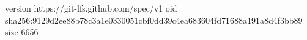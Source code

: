 version https://git-lfs.github.com/spec/v1
oid sha256:9129d2ee88b78c3a1e0330051cbf0dd39c4ea683604fd71688a191a8d4f3bb89
size 6656
